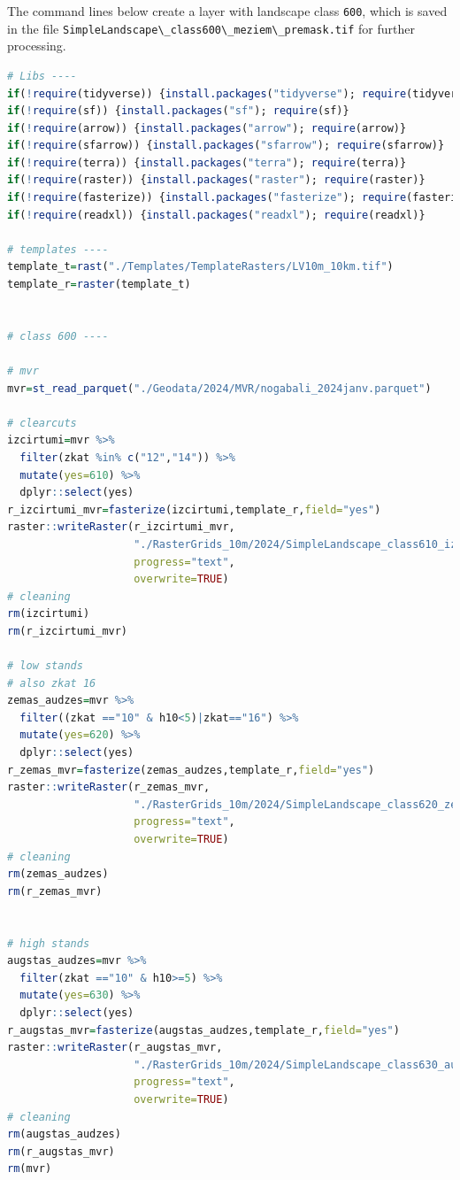 \documentclass[
]{book}
\newcommand{\passthrough}[1]{#1}
\begin{document}
The command lines below create a layer with landscape class \passthrough{\lstinline!600!}, which is saved
in the file \passthrough{\lstinline!SimpleLandscape\_class600\_meziem\_premask.tif!} for further processing.

\begin{lstlisting}[language=R]
# Libs ----
if(!require(tidyverse)) {install.packages("tidyverse"); require(tidyverse)}
if(!require(sf)) {install.packages("sf"); require(sf)}
if(!require(arrow)) {install.packages("arrow"); require(arrow)}
if(!require(sfarrow)) {install.packages("sfarrow"); require(sfarrow)}
if(!require(terra)) {install.packages("terra"); require(terra)}
if(!require(raster)) {install.packages("raster"); require(raster)}
if(!require(fasterize)) {install.packages("fasterize"); require(fasterize)}
if(!require(readxl)) {install.packages("readxl"); require(readxl)}

# templates ----
template_t=rast("./Templates/TemplateRasters/LV10m_10km.tif")
template_r=raster(template_t)


# class 600 ----

# mvr 
mvr=st_read_parquet("./Geodata/2024/MVR/nogabali_2024janv.parquet")

# clearcuts
izcirtumi=mvr %>% 
  filter(zkat %in% c("12","14")) %>% 
  mutate(yes=610) %>% 
  dplyr::select(yes)
r_izcirtumi_mvr=fasterize(izcirtumi,template_r,field="yes")
raster::writeRaster(r_izcirtumi_mvr,
                    "./RasterGrids_10m/2024/SimpleLandscape_class610_izcirtumi_mvr.tif",
                    progress="text",
                    overwrite=TRUE)
# cleaning
rm(izcirtumi)
rm(r_izcirtumi_mvr)

# low stands
# also zkat 16
zemas_audzes=mvr %>% 
  filter((zkat =="10" & h10<5)|zkat=="16") %>% 
  mutate(yes=620) %>% 
  dplyr::select(yes)
r_zemas_mvr=fasterize(zemas_audzes,template_r,field="yes")
raster::writeRaster(r_zemas_mvr,
                    "./RasterGrids_10m/2024/SimpleLandscape_class620_zemas_mvr.tif",
                    progress="text",
                    overwrite=TRUE)
# cleaning
rm(zemas_audzes)
rm(r_zemas_mvr)


# high stands
augstas_audzes=mvr %>% 
  filter(zkat =="10" & h10>=5) %>% 
  mutate(yes=630) %>% 
  dplyr::select(yes)
r_augstas_mvr=fasterize(augstas_audzes,template_r,field="yes")
raster::writeRaster(r_augstas_mvr,
                    "./RasterGrids_10m/2024/SimpleLandscape_class630_augstas_mvr.tif",
                    progress="text",
                    overwrite=TRUE)
# cleaning
rm(augstas_audzes)
rm(r_augstas_mvr)
rm(mvr)


\end{lstlisting}
\end{document}

